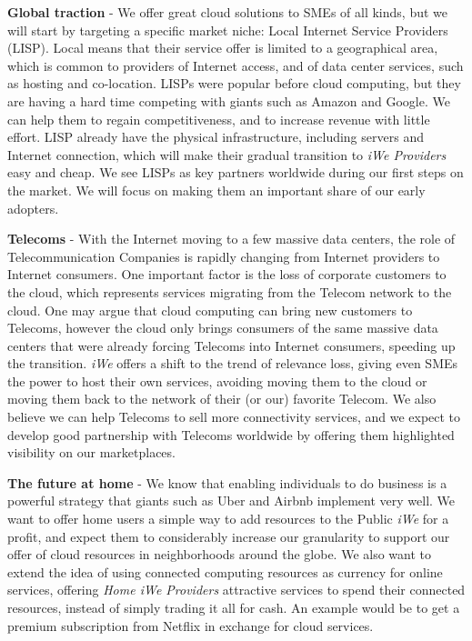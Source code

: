 \textbf{Global traction} - We offer great cloud solutions to SMEs of all kinds,
but we will start by targeting a specific market niche: Local Internet Service
Providers (LISP). Local means that their service offer is limited to a
geographical area, which is common to providers of Internet access, and of data
center services, such as hosting and co-location. LISPs were popular before cloud
computing, but they are having a hard time competing with giants such as Amazon
and Google. We can help them to regain competitiveness, and to increase revenue
with little effort.  LISP already have the physical infrastructure, including
servers and Internet connection, which will make their gradual transition to
\textit{iWe Providers} easy and cheap. We see LISPs as key partners worldwide
during our first steps on the market.  We will focus on making them an important
share of our early adopters.

\textbf{Telecoms} - With the Internet moving to a few massive data centers, the
role of Telecommunication Companies is rapidly changing from Internet providers
to Internet consumers. One important factor is the loss of corporate customers
to the cloud, which represents services migrating from the Telecom network to
the cloud. One may argue that cloud computing can bring new customers to
Telecoms, however the cloud only brings consumers of the same massive data
centers that were already forcing Telecoms into Internet consumers, speeding up
the transition.  \textit{iWe} offers a shift to the trend of relevance loss,
giving even SMEs the power to host their own services, avoiding moving them to
the cloud or moving them back to the network of their (or our) favorite Telecom.
We also believe we can help Telecoms to sell more connectivity services, and we
expect to develop good partnership with Telecoms worldwide by offering them
highlighted visibility on our marketplaces.

\textbf{The future at home} - We know that enabling individuals to do business
is a powerful strategy that giants such as Uber and Airbnb implement very well.
We want to offer home users a simple way to add resources to the Public
\textit{iWe} for a profit, and expect them to considerably increase our
granularity to support our offer of cloud resources in neighborhoods around the
globe.  We also want to extend the idea of using connected computing resources
as currency for online services, offering \textit{Home iWe Providers}
attractive services to spend their connected resources, instead of simply
trading it all for cash. An example would be to get a premium subscription from
Netflix in exchange for cloud services.
